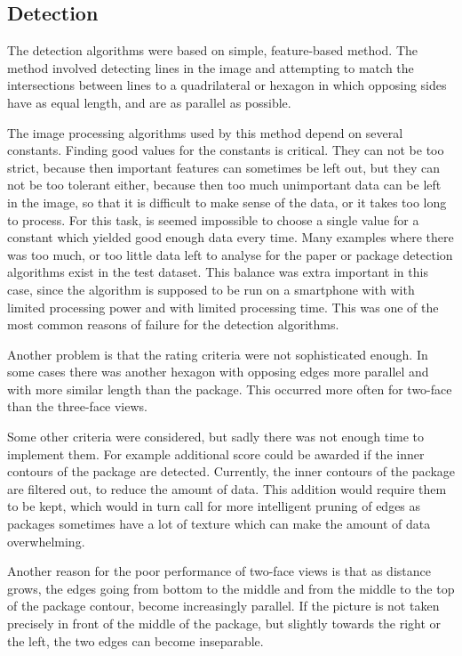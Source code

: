 \subsection{Detection}
The detection algorithms were based on simple, feature-based method. 
The method involved detecting lines in the image and attempting to match the intersections between lines to a quadrilateral or hexagon in which opposing sides have as equal length, and are as parallel as possible.

The image processing algorithms used by this method depend on several constants.
Finding good values for the constants is critical.
They can not be too strict, because then important features can sometimes be left out, but they can not be too tolerant either, because then too much unimportant data can be left in the image, so that it is difficult to make sense of the data, or it takes too long to process.
For this task, is seemed impossible to choose a single value for a constant which yielded good enough data every time.
Many examples where there was too much, or too little data left to analyse for the paper or package detection algorithms exist in the test dataset.
This balance was extra important in this case, since the algorithm is supposed to be run on a smartphone with with limited processing power and with limited processing time.
This was one of the most common reasons of failure for the detection algorithms.

Another problem is that the rating criteria were not sophisticated enough.
In some cases there was another hexagon with opposing edges more parallel and with more similar length than the package.
This occurred more often for two-face than the three-face views.

Some other criteria were considered, but sadly there was not enough time to implement them.
For example additional score could be awarded if the inner contours of the package are detected.
Currently, the inner contours of the package are filtered out, to reduce the amount of data.
This addition would require them to be kept, which would in turn call for more intelligent pruning of edges as packages sometimes have a lot of texture which can make the amount of data overwhelming.

Another reason for the poor performance of two-face views is that as distance grows, the edges going from bottom to the middle and from the middle to the top of the package contour, become increasingly parallel. 
If the picture is not taken precisely in front of the middle of the package, but slightly towards the right or the left, the two edges can become inseparable.

